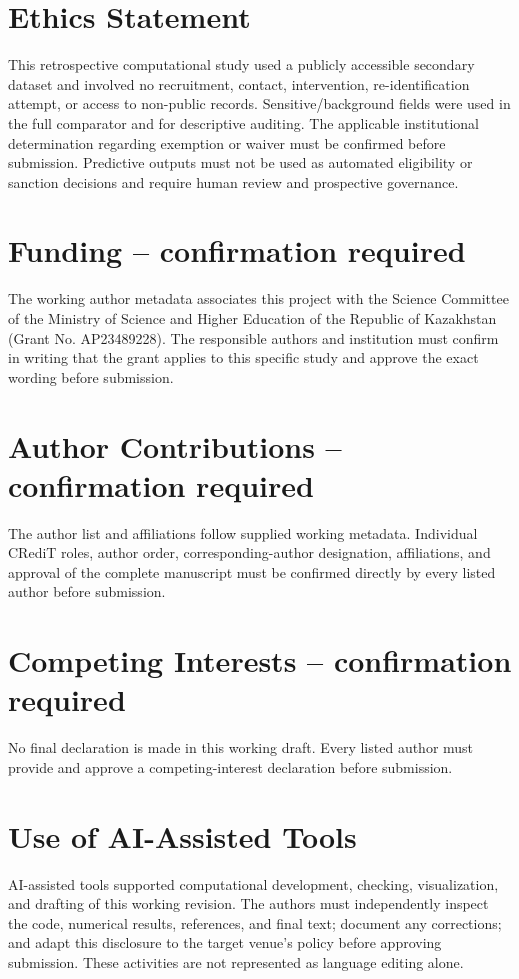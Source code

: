 \documentclass[11pt]{article}
\begin{document}
\section*{Ethics Statement}

This retrospective computational study used a publicly accessible secondary dataset and involved no recruitment, contact, intervention, re-identification attempt, or access to non-public records. Sensitive/background fields were used in the full comparator and for descriptive auditing. The applicable institutional determination regarding exemption or waiver must be confirmed before submission. Predictive outputs must not be used as automated eligibility or sanction decisions and require human review and prospective governance.

\section*{Funding -- confirmation required}

The working author metadata associates this project with the Science Committee of the Ministry of Science and Higher Education of the Republic of Kazakhstan (Grant No. AP23489228). The responsible authors and institution must confirm in writing that the grant applies to this specific study and approve the exact wording before submission.

\section*{Author Contributions -- confirmation required}

The author list and affiliations follow supplied working metadata. Individual CRediT roles, author order, corresponding-author designation, affiliations, and approval of the complete manuscript must be confirmed directly by every listed author before submission.

\section*{Competing Interests -- confirmation required}

No final declaration is made in this working draft. Every listed author must provide and approve a competing-interest declaration before submission.

\section*{Use of AI-Assisted Tools}

AI-assisted tools supported computational development, checking, visualization, and drafting of this working revision. The authors must independently inspect the code, numerical results, references, and final text; document any corrections; and adapt this disclosure to the target venue's policy before approving submission. These activities are not represented as language editing alone.



\end{document}
